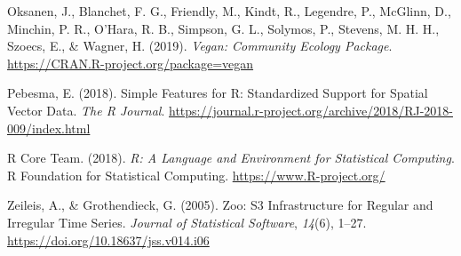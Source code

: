 \documentclass[
]{article}
\begin{document}
\leavevmode\hypertarget{ref-oksanen_vegan_2019}{}%
Oksanen, J., Blanchet, F. G., Friendly, M., Kindt, R., Legendre, P.,
McGlinn, D., Minchin, P. R., O'Hara, R. B., Simpson, G. L., Solymos, P.,
Stevens, M. H. H., Szoecs, E., \& Wagner, H. (2019). \emph{Vegan:
Community Ecology Package}.
\url{https://CRAN.R-project.org/package=vegan}

\leavevmode\hypertarget{ref-pebesma_simple_2018}{}%
Pebesma, E. (2018). Simple Features for R: Standardized Support for
Spatial Vector Data. \emph{The R Journal}.
\url{https://journal.r-project.org/archive/2018/RJ-2018-009/index.html}

\leavevmode\hypertarget{ref-r_core_team_r_2018}{}%
R Core Team. (2018). \emph{R: A Language and Environment for Statistical
Computing}. R Foundation for Statistical Computing.
\url{https://www.R-project.org/}

\leavevmode\hypertarget{ref-zeileis_zoo_2005}{}%
Zeileis, A., \& Grothendieck, G. (2005). Zoo: S3 Infrastructure for
Regular and Irregular Time Series. \emph{Journal of Statistical
Software}, \emph{14}(6), 1--27.
\url{https://doi.org/10.18637/jss.v014.i06}
\end{document}
